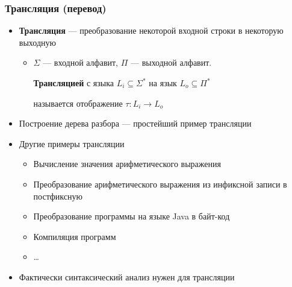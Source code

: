 \documentclass{beamer}
\begin{document}
\begin{frame}[fragile]
  \transwipe[direction=90]
  \frametitle{Трансляция (перевод)}
  \begin{itemize}
    \item \textbf{Трансляция} --- преобразование некоторой входной строки в некоторую выходную
    \begin{itemize}
      \item $\Sigma$ --- входной алфавит, $\Pi$ --- выходной алфавит. 
      
      \textbf{Трансляцией} с языка $L_i \subseteq \Sigma^*$ на язык $L_o \subseteq \Pi^*$ 
      
      называется отображение $\tau : L_i \rightarrow L_o$
    \end{itemize}
    \item Построение дерева разбора --- простейший пример трансляции
    \item Другие примеры трансляции
    \begin{itemize}
      \item Вычисление значения арифметического выражения
      \item Преобразование арифметического выражения из инфиксной записи в постфиксную
      \item Преобразование программы на языке Java в байт-код
      \item Компиляция программ
      \item \dots
    \end{itemize}
    \item Фактически синтаксический анализ нужен для трансляции
  \end{itemize}
\end{frame}
\end{document}

